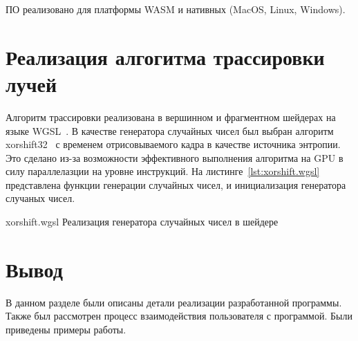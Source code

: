 ПО реализовано для платформы WASM и нативных (MacOS, Linux, Windows).

\section{Реализация алгогитма трассировки лучей}

Алгоритм трассировки реализована в 
вершинном и фрагментном шейдерах на языке WGSL~\cite{WebGPUSL}.
В качестве генератора случайных чисел был выбран алгоритм xorshift32~\cite{xorshift}
с временем отрисовываемого кадра в качестве источника энтропии. Это сделано
из-за возможности эффективного выполнения алгоритма на GPU в 
силу параллелазции на уровне инструкций. На листинге~\ref{lst:xorshift.wgsl} представлена 
функции генерации случайных чисел, и инициализация генератора случаных чисел.

    {xorshift.wgsl}
    {Реализация генератора случайных чисел в шейдере}

\section{Вывод}

В данном разделе были описаны детали реализации разработанной программы. 
Также был рассмотрен процесс взаимодействия пользователя с программой.
Были приведены примеры работы.
